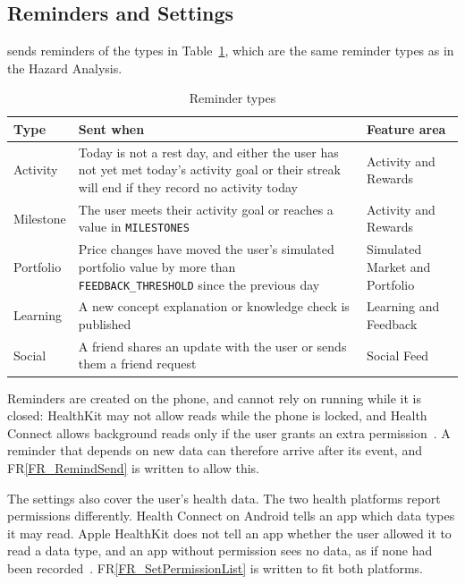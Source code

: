 \documentclass[12pt]{article}
\newcommand{\rref}[1]{FR\ref{#1}}
\begin{document}
\subsection{Reminders and Settings}

\progname{} sends reminders of the types in Table~\ref{TblReminderTypes}, which
are the same reminder types as in the Hazard Analysis.

\begin{table}[H]
\caption{Reminder types} \label{TblReminderTypes}
\small
\begin{tabularx}{\textwidth}{>{\raggedright\arraybackslash}p{}X>{\raggedright\arraybackslash}p{}}
\toprule
\textbf{Type} & \textbf{Sent when} & \textbf{Feature area}\\
\midrule
Activity & Today is not a rest day, and either the user has not yet met today's activity goal or their streak will end if they record no activity today & Activity and Rewards\\
Milestone & The user meets their activity goal or reaches a value in \texttt{MILESTONES} & Activity and Rewards\\
Portfolio & Price changes have moved the user's simulated portfolio value by more than \texttt{FEEDBACK\_THRESHOLD} since the previous day & Simulated Market and Portfolio\\
Learning & A new concept explanation or knowledge check is published & Learning and Feedback\\
Social & A friend shares an update with the user or sends them a friend request & Social Feed\\
\bottomrule
\end{tabularx}
\end{table}

Reminders are created on the phone, and \progname{} cannot rely on running while
it is closed: HealthKit may not allow reads while the phone is locked, and Health
Connect allows background reads only if the user grants an extra
permission~\citep{AppleHealthKit, GoogleHealthConnect}. A reminder that depends
on new data can therefore arrive after its event, and \rref{FR_RemindSend} is
written to allow this.

The settings also cover the user's health data. The two health platforms
report permissions differently. Health Connect on Android tells an app which
data types it may read. Apple HealthKit does not tell an app whether the user
allowed it to read a data type, and an app without permission sees no data, as
if none had been recorded~\citep{AppleHealthKit, GoogleHealthConnect}.
\rref{FR_SetPermissionList} is written to fit both platforms.
\end{document}
